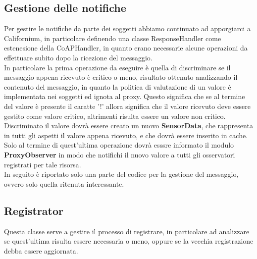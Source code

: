 \subsection{Gestione delle notifiche}
Per gestire le notifiche da parte dei soggetti abbiamo continuato ad apporgiarci a Californium, in particolare definendo una classe ResponseHandler come estenesione della CoAPHandler, in quanto erano necessarie alcune operazioni da effettuare subito dopo la ricezione del messaggio. \\
In particolare la prima operazione da eseguire è quella di discriminare se il messaggio appena ricevuto è critico o meno, risultato ottenuto analizzando il contenuto del messaggio, in quanto la politica di valutazione di un valore è implementata nei soggetti ed ignota al proxy. Questo significa che se al termine del valore è presente il caratte '!' allora significa che il valore ricevuto deve essere gestito come valore critico, altrimenti risulta essere un valore non critico. \\
Discriminato il valore dovrà essere creato un nuovo \textbf{SensorData}, che rappresenta in tutti gli aspetti il valore appena ricevuto, e che dovrà essere inserito in cache. Solo al termine di quest'ultima operazione dovrà esssre informato il modulo \textbf{ProxyObserver} in modo che notifichi il nuovo valore a tutti gli osservatori registrati per tale risorsa. \\
In seguito è riportato solo una parte del codice per la gestione del messaggio, ovvero solo quella ritenuta interessante. \\

\subsection{Registrator}
Questa classe serve a gestire il processo di registrare, in particolare ad analizzare se quest'ultima risulta essere necessaria o meno, oppure se la vecchia registrazione debba essere aggiornata. \\

